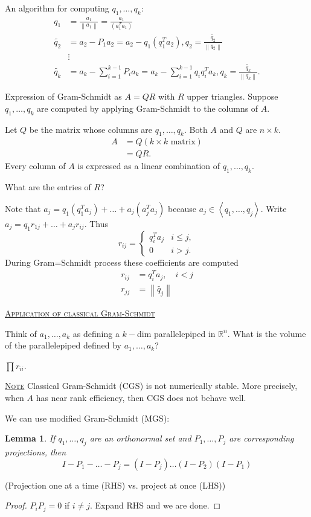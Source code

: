\documentclass{report}
\newcommand{\R}{\mathbb{R}}
\newcommand{\gen}[1]{\left\langle #1\right\rangle}
\newcommand{\norm}[1]{\left\| #1 \right\|}
\newcommand{\fancyem}[1]{\underline{\textsc{#1}}}
\newtheorem{lemma}{Lemma}[section]
\theoremstyle{definition}
\theoremstyle{remark}
\numberwithin{equation}{section}
\begin{document}
An algorithm for computing $q_1, \ldots, q_k$:
\begin{align*}
    q_1 & = \frac{a_1}{\norm{a_1}} = \frac{a_1}{(a_1^Ta_1)} \\
    \tilde{q_2} & = a_2 - P_1a_2 = a_2 - q_1(q_1^Ta_2), q_2 = \frac{\tilde{q_2}}{\norm{q_2}} \\
    & \vdots \\
    \tilde{q_k} & = a_k - \sum_{i=1}^{k-1} P_ia_k = a_k - \sum_{i=1}^{k-1} q_iq_i^Ta_k, q_k = \frac{\tilde{q_k}}{\norm{q_k}}. 
\end{align*}

Expression of Gram-Schmidt as $A = QR$ with $R$ upper triangles. Suppose $q_1, \ldots, q_k$ are computed by applying Gram-Schmidt to the columns of $A$.

Let $Q$ be the matrix whose columns are $q_1, \ldots, q_k$. Both $A$ and $Q$ are $n \times k$.
\begin{align*}
    A & = Q (k \times k \text{ matrix}) \\
    & = QR.
\end{align*}
Every column of $A$ is expressed as a linear combination of $q_1, \ldots, q_k$. 

What are the entries of $R$?

Note that $a_j = q_1(q_1^Ta_j) + \ldots + a_j(a_j^Ta_j)$ because $a_j \in \gen{q_1, \ldots, q_j}$. Write $a_j = q_1r_{1j} + \ldots + a_jr_{ij}$. Thus \[
    r_{ij}  = \begin{cases}
        q_i^Ta_j & i \leq j, \\
        0 & i > j.
    \end{cases}    
\]
During Gram=Schmidt process these coefficients are computed \begin{align*}
    r_{ij} & = q_i^Ta_j, \quad i < j \\
    r_{jj} & = \norm{\tilde{q_j}}
\end{align*}

\fancyem{Application of classical Gram-Schmidt}

Think of $a_1, \ldots, a_k$ as defining a $k-$dim parallelepiped in $\R^n$. What is the volume of the parallelepiped defined by $a_1, \ldots, a_k$? 

$\prod r_{ii}$. 

\fancyem{Note} Classical Gram-Schmidt (CGS) is not numerically stable. More precisely, when $A$ has near rank efficiency, then CGS does not behave well.

We can use modified Gram-Schmidt (MGS):
\begin{lemma}
    If $q_1, \ldots, q_j$ are an orthonormal set and $P_1, \ldots, P_j$ are corresponding projections, then \[
        I - P_1 - \ldots - P_j = (I - P_j) \ldots (I - P_2) (I - P_1)    
    \]
\end{lemma}
(Projection one at a time (RHS) vs. project at once (LHS))
\begin{proof}
    $P_iP_j = 0$ if $i \neq j$. Expand RHS and we are done.
\end{proof}
\end{document}

